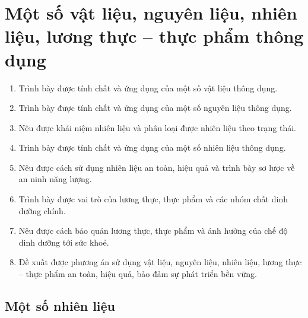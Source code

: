 \documentclass[Main.tex]{subfiles}
\begin{document}
\gdef\muctieu{%
	\begin{enumerate}
		\item Trình bày được tính chất và ứng dụng của một số vật liệu thông dụng.
		\item Trình bày được tính chất và ứng dụng của một số nguyên liệu thông dụng.
		\item Nêu được khái niệm nhiên liệu và phân loại được nhiên liệu theo trạng thái.
		\item Trình bày được tính chất và ứng dụng của một số nhiên liệu thông dụng.
		\item Nêu được cách sử dụng nhiên liệu an toàn, hiệu quả và trình bày sơ lược về an ninh năng lượng.
		\item Trình bày được vai trò của lương thực, thực phẩm và các nhóm chất dinh dưỡng chính.
		\item Nêu được cách bảo quản lương thực, thực phẩm và ảnh hưởng của chế độ dinh dưỡng tới sức khoẻ.
		\item Đề xuất được phương án sử dụng vật liệu, nguyên liệu, nhiên liệu, lương thực -- thực phẩm an toàn, hiệu quả, bảo đảm sự phát triển bền vững.
	\end{enumerate}
}%
\chapter{Một số vật liệu, nguyên liệu, nhiên liệu, lương thực – thực phẩm thông dụng}
\begin{Muctieu}
	\muctieu
\end{Muctieu}
\section{Một số nhiên liệu}
\end{document}
